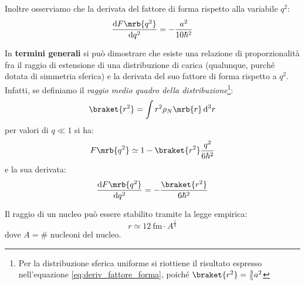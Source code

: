 \begin{itemize}
    Inoltre osserviamo che la derivata del fattore di forma rispetto alla
      variabile $q^2$:
    \begin{equation}
      \frac{\mathrm{d}F\mrb{q^2}}{\mathrm{d}q^2} = -\frac{a^2}{10\hbar^2}
    \end{equation}

    In \textbf{termini generali} si può dimostrare che esiste una
    relazione di proporzionalità fra il raggio di estensione di una
    distribuzione di carica (qualunque, purché dotata di simmetria sferica) e
    la derivata del suo fattore di forma rispetto a $q^2$. Infatti, se
    definiamo il \textit{raggio medio quadro della distribuzione}\footnote{
      Per la distribuzione sferica uniforme si riottiene il risultato espresso
      nell'equazione \ref{eq:deriv_fattore_forma}, poiché $\braket{r^2} =
      \frac{3}{5}a^2$
    }:
    \begin{equation}
      \braket{r^2} = \int r^2 \rho_N\mrb{r} \, \mathrm{d}^3r
    \end{equation}
    per valori di $q \ll 1$ si ha:
    \begin{equation}
      F\mrb{q^2} \simeq 1 - \braket{r^2} \frac{q^2}{6\hbar^2}
    \end{equation}
    e la sua derivata:
    \begin{equation}
      \frac{\mathrm{d}F\mrb{q^2}}{\mathrm{d}q^2} =
      -\frac{\braket{r^2}}{6\hbar^2}
    \end{equation}



    \begin{note}
      Il raggio di un nucleo può essere stabilito tramite la legge empirica:
      \[
        r \simeq \SI{12}{\femto\m} \cdot A^{\frac{1}{3}}
      \]
      dove $A = \# \text{ nucleoni del nucleo}$.
    \end{note}


\end{itemize}
